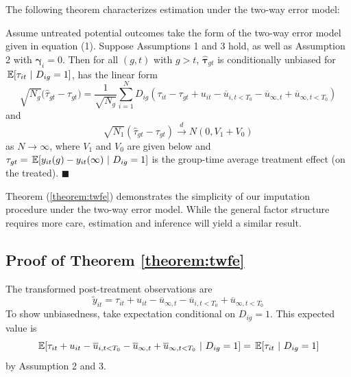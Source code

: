 \documentclass[12pt]{article}
\begin{document}
The following theorem characterizes estimation under the two-way error model:
\begin{theorem}\label{theorem:twfe}
    Assume untreated potential outcomes take the form of the two-way error model given in equation (1). Suppose Assumptions 1 and 3 hold, as well as Assumption 2 with $\bm \gamma_i = 0$. Then for all $(g, t)$ with $g > t$, $\widehat{\bm \tau}_{gt}$ is conditionally unbiased for $\expec{\tau_{it}}{D_{ig} = 1}$, has the linear form
    \begin{equation}\label{eq:twfe_influence}
        \sqrt{N_{g}} \big( \widehat{\tau}_{gt} - \tau_{gt} \big) 
        = \frac{1}{\sqrt{N_{g}}}\sum_{i=1}^N D_{ig} (\tau_{it} - \tau_{gt} + u_{it} - \overline{u}_{i,t < T_0} - \overline{u}_{\infty,t} + \overline{u}_{\infty,t < T_0})
    \end{equation}
    and  
    \begin{equation}\label{eq:twfe_asymptotic}
        \sqrt{N_1}(\widehat{\tau}_{gt} - \tau_{gt}) \stackrel{d}{\rightarrow} N(0, V_1 + V_0)
    \end{equation}
    as $N \rightarrow \infty$, where $V_1$ and $V_0$ are given below and $\tau_{gt} = \expec{y_{it}(g) - y_{it}(\infty)}{D_{ig} = 1}$ is the group-time average treatment effect (on the treated). $\blacksquare$
\end{theorem}
Theorem (\ref{theorem:twfe}) demonstrates the simplicity of our imputation procedure under the two-way error model. While the general factor structure requires more care, estimation and inference will yield a similar result.


\subsection*{Proof of Theorem \ref{theorem:twfe}}

The transformed post-treatment observations are
\begin{equation}
    \tilde{y}_{it} = \tau_{it} + u_{it} - \overline{u}_{\infty,t}  - \overline{u}_{i,t < T_0} + \overline{u}_{\infty,t < T_0}
\end{equation}
To show unbiasedness, take expectation conditional on $D_{ig} = 1$. This expected value is
\begin{equation}
    \expec{ \tau_{it} + u_{it} - \overline{u}_{i,t < T_0} - \overline{u}_{\infty,t} + \overline{u}_{\infty,t < T_0} }{D_{ig} = 1} = \expec{\tau_{it}}{D_{ig} = 1}
\end{equation}
by Assumption 2 and 3.
\end{document}
